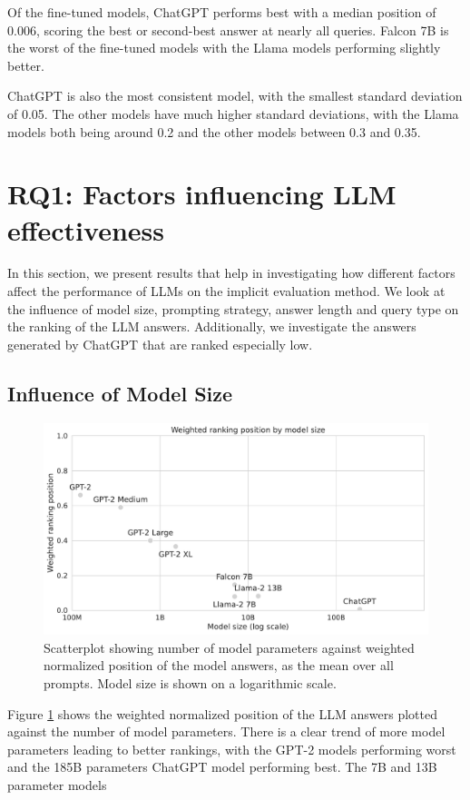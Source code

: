 Of the fine-tuned models, ChatGPT performs best with a median position of 0.006, scoring the best or second-best answer at nearly all queries.
Falcon 7B is the worst of the fine-tuned models with the Llama models performing slightly better.

ChatGPT is also the most consistent model, with the smallest standard deviation of 0.05.
The other models have much higher standard deviations, with the Llama models both being around 0.2 and the other models between 0.3 and 0.35.

\section{RQ1: Factors influencing LLM effectiveness}
In this section, we present results that help in investigating how different factors affect the performance of LLMs on the implicit evaluation method.
We look at the influence of model size, prompting strategy, answer length and query type on the ranking of the LLM answers.
Additionally, we investigate the answers generated by ChatGPT that are ranked especially low.

\subsection{Influence of Model Size}
\begin{figure}
    \centering
    \includegraphics[width=\textwidth]{images/weighted_position_vs_model_size.pdf}
    \caption{Scatterplot showing number of model parameters against weighted normalized position of the model answers, as the mean over all prompts. Model size is shown on a logarithmic scale.}
    \label{fig:weighted_position_vs_model_size}
\end{figure}

Figure \ref{fig:weighted_position_vs_model_size} shows the weighted normalized position of the LLM answers plotted against the number of model parameters.
There is a clear trend of more model parameters leading to better rankings, with the GPT-2 models performing worst and the 185B parameters ChatGPT model performing best.
The 7B and 13B parameter models 



